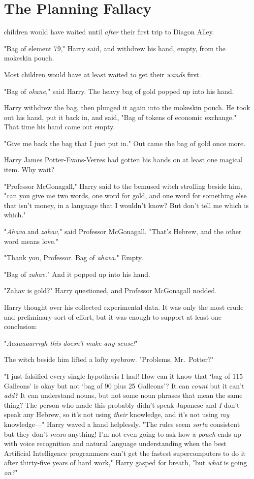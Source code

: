 \chapter{The Planning Fallacy}

 children would have waited until \emph{after} their first trip to
Diagon Alley.

"Bag of element 79," Harry said, and withdrew his hand, empty, from the
mokeskin pouch.

Most children would have at least waited to get their \emph{wands} first.

"Bag of \emph{okane,}" said Harry. The heavy bag of gold popped up into his
hand.

Harry withdrew the bag, then plunged it again into the mokeskin pouch. He took
out his hand, put it back in, and said, "Bag of tokens of economic exchange."
That time his hand came out empty.

"Give me back the bag that I just put in." Out came the bag of gold once more.

Harry James Potter-Evans-Verres had gotten his hands on at least one magical
item. Why wait?

"Professor McGonagall," Harry said to the bemused witch strolling beside him,
"can you give me two words, one word for gold, and one word for something else
that isn't money, in a language that I wouldn't know? But don't tell me which
is which."

"\emph{Ahava} and \emph{zahav,}" said Professor McGonagall. "That's Hebrew, and
the other word means love."

"Thank you, Professor. Bag of \emph{ahava.}" Empty.

"Bag of \emph{zahav.}" And it popped up into his hand.

"Zahav is gold?" Harry questioned, and Professor McGonagall nodded.

Harry thought over his collected experimental data. It was only the most crude
and preliminary sort of effort, but it was enough to support at least one
conclusion:

"\emph{Aaaaaaarrrgh this doesn't make any sense!}"

The witch beside him lifted a lofty eyebrow. "Problems, Mr.~Potter?"

"I just falsified every single hypothesis I had! How can it know that `bag of
115 Galleons' is okay but not `bag of 90 plus 25 Galleons'? It can \emph{count}
but it can't \emph{add?} It can understand nouns, but not some noun phrases
that mean the same thing? The person who made this probably didn't speak
Japanese and \emph{I} don't speak any Hebrew, so it's not using \emph{their}
knowledge, and it's not using \emph{my} knowledge—" Harry waved a hand
helplessly. "The rules seem \emph{sorta} consistent but they don't \emph{mean}
anything! I'm not even going to ask how a \emph{pouch} ends up with voice
recognition and natural language understanding when the best Artificial
Intelligence programmers can't get the fastest supercomputers to do it after
thirty-five years of hard work," Harry gasped for breath, "but \emph{what} is
going \emph{on?}"

